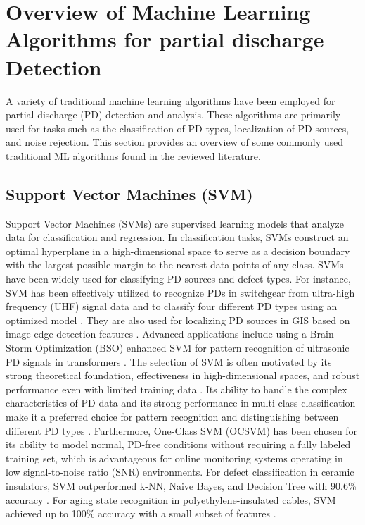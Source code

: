 \section{Overview of Machine Learning Algorithms for partial discharge Detection}

A variety of traditional machine learning algorithms have been employed for partial discharge (PD) detection and analysis. These algorithms are primarily used for tasks such as the classification of PD types, localization of PD sources, and noise rejection. This section provides an overview of some commonly used traditional ML algorithms found in the reviewed literature.

\subsection{Support Vector Machines (SVM)}

Support Vector Machines (SVMs) are supervised learning models that analyze data for classification and regression. In classification tasks, SVMs construct an optimal hyperplane in a high-dimensional space to serve as a decision boundary with the largest possible margin to the nearest data points of any class. SVMs have been widely used for classifying PD sources and defect types. For instance, SVM has been effectively utilized to recognize PDs in switchgear from ultra-high frequency (UHF) signal data \parencite{Jin_2018_1} and to classify four different PD types using an optimized model \parencite{Dai_2017}. They are also used for localizing PD sources in GIS based on image edge detection features \parencite{Li_2019_7}. Advanced applications include using a Brain Storm Optimization (BSO) enhanced SVM for pattern recognition of ultrasonic PD signals in transformers \parencite{Zhou_2022_4}. The selection of SVM is often motivated by its strong theoretical foundation, effectiveness in high-dimensional spaces, and robust performance even with limited training data \parencite{Zhou_2017, Bin_2020_1}. Its ability to handle the complex characteristics of PD data and its strong performance in multi-class classification make it a preferred choice for pattern recognition and distinguishing between different PD types \parencite{Jin_2018_1}. Furthermore, One-Class SVM (OCSVM) has been chosen for its ability to model normal, PD-free conditions without requiring a fully labeled training set, which is advantageous for online monitoring systems operating in low signal-to-noise ratio (SNR) environments. For defect classification in ceramic insulators, SVM outperformed k-NN, Naive Bayes, and Decision Tree with 90.6\% accuracy \parencite{Ma_2021_3}. For aging state recognition in polyethylene-insulated cables, SVM achieved up to 100\% accuracy with a small subset of features \parencite{Morette_2020_1}.

